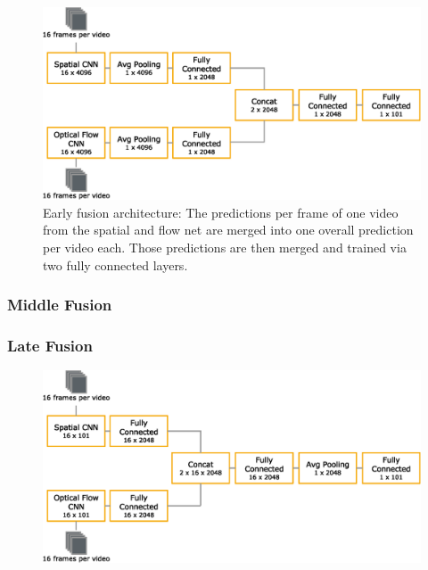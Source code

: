 \begin{figure}[!htb]
	\centering
	\includegraphics[scale=.7]{images/early_fusion.eps}
	\caption{Early fusion architecture: The predictions per frame of one video from the spatial and flow net are merged into one overall prediction per video each. Those predictions are then merged and trained via two fully connected layers.}
	\label{fig:early_fusion}
\end{figure}


\subsubsection{Middle Fusion}


\subsubsection{Late Fusion}


\begin{figure}[!htb]
	\centering
	\includegraphics[scale=.7]{images/late_fusion.eps}
	\caption{}
	\label{fig:late_fusion}
\end{figure}